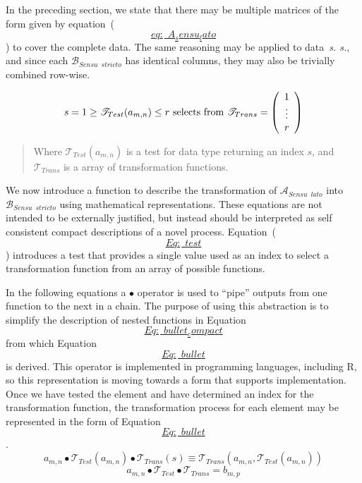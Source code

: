 \documentclass[
]{article}
\begin{document}
In the preceding section, we state that there may be multiple matrices
of the form given by
equation~(\protect\hyperlink{eq:_A_sensu_lato}{\[eq:\_A_sensu_lato\]})
to cover the complete data. The same reasoning may be applied to
data~\emph{s. s.}, and since each
\(\mathscr{B}_{Sensu \enspace stricto}\) has identical columns, they may
also be trivially combined row-wise.

\[\label{Eq:_test}
    s = 1 \geq
    \mathscr{T}_{Test}(a_{m,n}) \leq r \\
    \textrm{ selects from }
    \mathscr{T}_{Trans} =
    \left(
    \begin{array}{c}
        1 \\
        \vdots \\
        r
    \end{array} 
    \right) %
\]

\begin{quote}
Where \(\mathscr{T}_{Test}(a_{m,n})\) is a test for data type returning
an index \(s\), and \(\mathscr{T}_{Trans}\) is a array of transformation
functions.
\end{quote}

We now introduce a function to describe the transformation of
\(\mathscr{A}_{Sensu \enspace lato}\) into
\(\mathscr{B}_{Sensu \enspace stricto}\) using mathematical
representations. These equations are not intended to be externally
justified, but instead should be interpreted as self consistent compact
descriptions of a novel process.
Equation~(\protect\hyperlink{Eq:_test}{\[Eq:\_test\]}) introduces a test
that provides a single value used as an index to select a transformation
function from an array of possible functions.

In the following equations a \(\bullet\) operator is used to ``pipe''
outputs from one function to the next in a chain. The purpose of using
this abstraction is to simplify the description of nested functions in
Equation~\protect\hyperlink{Eq:_bullet_compact}{\[Eq:\_bullet_compact\]}
from which Equation~\protect\hyperlink{Eq:_bullet}{\[Eq:\_bullet\]} is
derived. This operator is implemented in programming languages,
including R, so this representation is moving towards a form that
supports implementation. Once we have tested the element and have
determined an index for the transformation function, the transformation
process for each element may be represented in the form of
Equation~\protect\hyperlink{Eq:_bullet}{\[Eq:\_bullet\]}.
\[\label{Eq:_bullet_compact}
    a_{m,n} \bullet \mathscr{T}_{Test}(a_{m,n}) \bullet \mathscr{T}_{Trans}(s) \equiv \mathscr{T}_{Trans}(a_{m,n} , \mathscr{T}_{Test}(a_{m,n}))\]
\[\label{Eq:_bullet}
    a_{m,n} \bullet \mathscr{T}_{Test} \bullet \mathscr{T}_{Trans} =
    b_{m,p}\]
\end{document}
